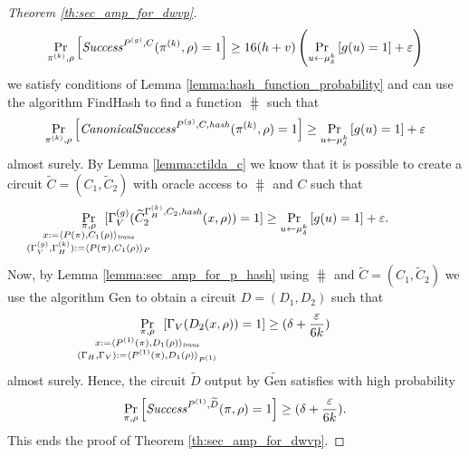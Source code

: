 \begin{proof}[Theorem \ref{th:sec_amp_for_dwvp}]
\begin{align*}
    \underset{\pi^{(k)}, \rho}{\Pr}\left[\operatorname{\mathit{Success}}^{P^{(g)}, C}(\pi^{(k)}, \rho) = 1\right] \geq 16(h+v)\left(\underset{u \leftarrow \mu_\delta^k}{\Pr}\left[g(u) = 1\right] + \varepsilon\right)
\end{align*}
we satisfy conditions of Lemma \ref{lemma:hash_function_probability} and can use the algorithm FindHash to find a function $\hash$ such that
\begin{align*}
    \underset{\pi^{(k)}, \rho}{\Pr}\left[\operatorname{\mathit{CanonicalSuccess}}^{P^{(g)}, C, \operatorname{\mathit{hash}}}(\pi^{(k)}, \rho) = 1\right] \geq \underset{u \leftarrow \mu_\delta^k}{\Pr}\left[g(u) = 1\right] + \varepsilon
\end{align*}
almost surely.
By Lemma \ref{lemma:ctilda_c} we know that it is possible to create a circuit $\widetilde{C} = (C_1, \widetilde{C}_2)$ with oracle access to $\hash$ and $C$ such that
\begin{align*}
    \underset{
      \mathclap {
      \substack{\pi, \rho \\
        x := \langle P(\pi), C_1(\rho) \rangle_{\mathit{trans}} \\
        (\Gamma_V^{(g)}, \Gamma_H^{(k)}) := \langle P(\pi), C_1(\rho) \rangle_{P}
      }}}
    {\Pr}\mkern13mu[\Gamma_V^{(g)}(\widetilde{C}_2^{\Gamma_H^{(k)}, C_2, \hash}(x, \rho)) = 1]
    \geq
\underset{u \leftarrow \mu_\delta^k}{\Pr}\left[g(u) = 1\right] + \varepsilon.
\end{align*}
Now, by Lemma \ref{lemma:sec_amp_for_p_hash} using $\hash$ and $\widetilde{C} = (C_1, \widetilde{C}_2)$ we use the algorithm Gen to obtain a circuit $D = (D_1, D_2)$ such that
\begin{align}
  \label{eq:succ_prob_d}
    \underset{
      \mathclap{
      \substack{\pi, \rho \\ x := \langle P^{(1)}(\pi), D_1(\rho) \rangle_{\mathit{trans}} \\
        (\Gamma_H, \Gamma_V) := \langle P^{(1)}(\pi), D_1(\rho) \rangle_{P^{(1)}}}}}
    {\Pr}\mkern13mu[\Gamma_V(D_2(x, \rho)) = 1] \geq (\delta + \frac{\varepsilon}{6k})
\end{align}
almost surely.
Hence, the circuit $\widetilde{D}$ output by $\widetilde{\text{Gen}}$ satisfies with high probability
\begin{align*}
    \underset{\pi, \rho}{\Pr}\left[\operatorname{\mathit{Success}}^{P^{(1)},\widetilde{D}}(\pi, \rho) = 1\right] \geq (\delta + \frac{\varepsilon}{6k}).
\end{align*}
This ends the proof of Theorem \ref{th:sec_amp_for_dwvp}.
%
\end{proof}

